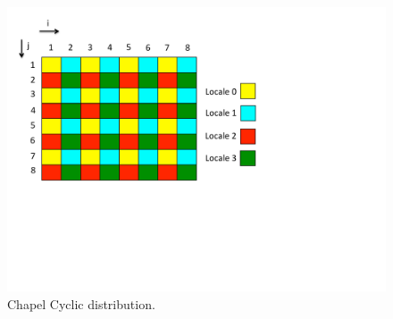\begin{figure}
	\begin{center}
	\includegraphics[scale=0.55]{./Figures/cyc_dist}
	\caption{Chapel Cyclic distribution.}
	\label{cyc_dist}
	\end{center}
\end{figure}



